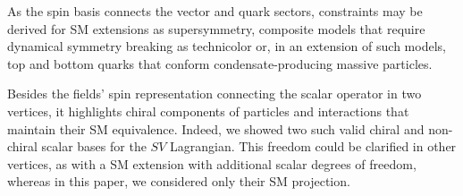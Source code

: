 \documentclass[12pt]{article}
\renewcommand\[{\begin{dmath}}
\renewcommand\]{\end{dmath}}
\begin{document}
 As the spin basis connects the vector and quark sectors, constraints may be derived for      SM extensions
   as supersymmetry\cite{supersymmetry},    composite models that require    dynamical  symmetry breaking\cite{NambuJona} as
 technicolor\cite{technicolor}
   or, in an extension of  such models,
 top and  bottom   quarks\cite{Bardeen} that  conform   condensate-producing massive particles.









Besides  the fields' spin representation  connecting the scalar operator in two vertices, it
highlights chiral components of     particles and   interactions
 that   maintain  their SM equivalence.
  Indeed,  we showed two   such valid   chiral and non-chiral scalar bases for the   $SV$ Lagrangian.
  This  freedom  could be clarified in other vertices, as with a SM extension with additional scalar degrees of freedom, whereas in this paper, we considered only their SM projection.

\end{document}
